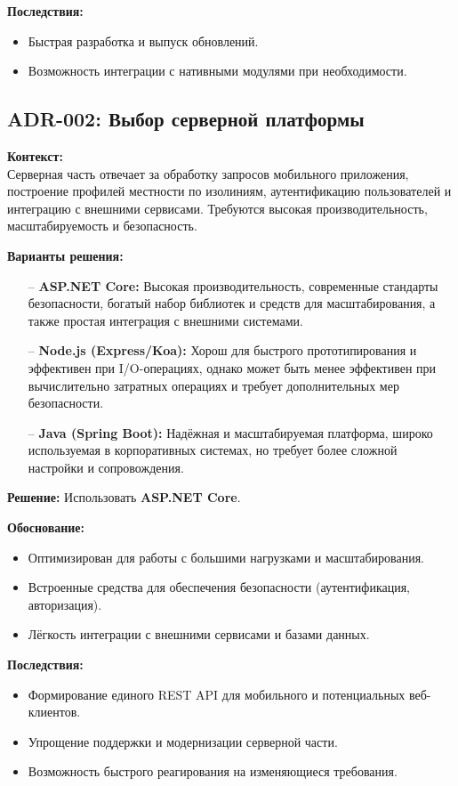 \documentclass[a4paper,12pt]{article}
\begin{document}
\textbf{Последствия:}
\begin{itemize}
    \item Быстрая разработка и выпуск обновлений.
    \item Возможность интеграции с нативными модулями при необходимости.
\end{itemize}

\subsection{ADR-002: Выбор серверной платформы}

\textbf{Контекст:}\\
Серверная часть отвечает за обработку запросов мобильного приложения, построение профилей местности по изолиниям, аутентификацию пользователей и интеграцию с внешними сервисами. Требуются высокая производительность, масштабируемость и безопасность.

\textbf{Варианты решения:}
\begin{itemize}[leftmargin=2cm]
    \item[--] \textbf{ASP.NET Core:} Высокая производительность, современные стандарты безопасности, богатый набор библиотек и средств для масштабирования, а также простая интеграция с внешними системами.
    \item[--] \textbf{Node.js (Express/Koa):} Хорош для быстрого прототипирования и эффективен при I/O-операциях, однако может быть менее эффективен при вычислительно затратных операциях и требует дополнительных мер безопасности.
    \item[--] \textbf{Java (Spring Boot):} Надёжная и масштабируемая платформа, широко используемая в корпоративных системах, но требует более сложной настройки и сопровождения.
\end{itemize}

\textbf{Решение:} Использовать \textbf{ASP.NET Core}.

\textbf{Обоснование:}
\begin{itemize}
    \item Оптимизирован для работы с большими нагрузками и масштабирования.
    \item Встроенные средства для обеспечения безопасности (аутентификация, авторизация).
    \item Лёгкость интеграции с внешними сервисами и базами данных.
\end{itemize}

\textbf{Последствия:}
\begin{itemize}
    \item Формирование единого REST API для мобильного и потенциальных веб-клиентов.
    \item Упрощение поддержки и модернизации серверной части.
    \item Возможность быстрого реагирования на изменяющиеся требования.
\end{itemize}
\end{document}
